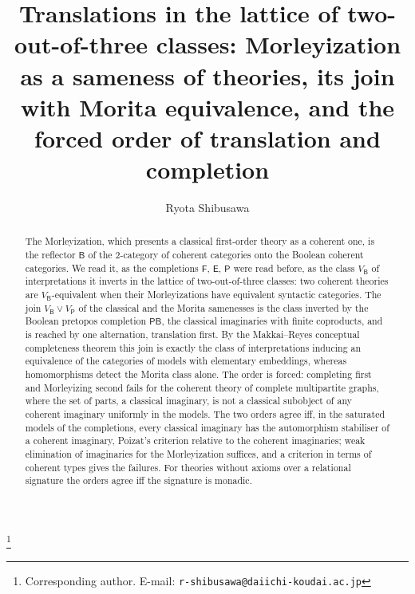 \documentclass[11pt]{amsart}
\theoremstyle{definition}
\newcommand{\FF}{\mathsf F}
\newcommand{\EE}{\mathsf E}
\newcommand{\PP}{\mathsf P}
\newcommand{\BB}{\mathsf B}
\begin{document}
\title[Morleyization in the sameness lattice]{Translations in the lattice of two-out-of-three classes: Morleyization as a sameness of theories, its join with Morita equivalence, and the forced order of translation and completion}
\author{Ryota Shibusawa}
\thanks{Corresponding author. E-mail: \texttt{r-shibusawa@daiichi-koudai.ac.jp}}
\address{Daiichi Institute of Technology}

\begin{abstract}
The Morleyization, which presents a classical first-order theory as a
coherent one, is the reflector $\BB$ of the $2$-category of coherent
categories onto the Boolean coherent categories. We read it, as the
completions $\FF$, $\EE$, $\PP$ were read before, as the class $V_\BB$
of interpretations it inverts in the lattice of two-out-of-three
classes: two coherent theories are $V_\BB$-equivalent when their
Morleyizations have equivalent syntactic categories. The join $V_\BB\vee
V_\PP$ of the classical and the Morita samenesses is the class
inverted by the Boolean pretopos completion $\PP\BB$, the classical
imaginaries with finite coproducts, and is reached by one
alternation, translation first. By the Makkai--Reyes conceptual
completeness theorem this join is exactly the class of interpretations
inducing an equivalence of the categories of models with elementary
embeddings, whereas homomorphisms detect the Morita class alone. The
order is forced: completing first and Morleyizing second fails for the
coherent theory of complete multipartite graphs, where the set of
parts, a classical imaginary, is not a classical subobject of any
coherent imaginary uniformly in the models. The two orders agree iff, in the
saturated models of the completions, every classical imaginary has the
automorphism stabiliser of a coherent imaginary, Poizat's criterion
relative to the coherent imaginaries; weak elimination of imaginaries
for the Morleyization suffices, and a criterion in terms of coherent
types gives the failures. For theories without axioms over a relational signature the orders
agree iff the signature is monadic.
\end{abstract}

\maketitle
\end{document}
